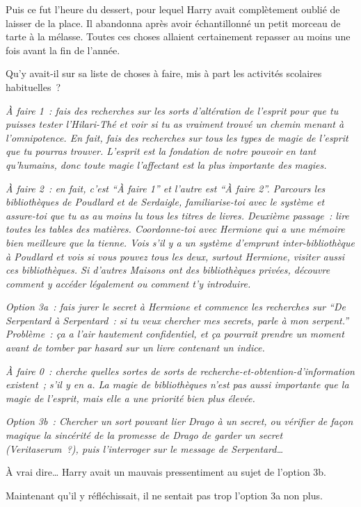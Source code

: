 Puis ce fut l'heure du dessert, pour lequel Harry avait complètement oublié de laisser de la place. Il abandonna après avoir échantillonné un petit morceau de tarte à la mélasse. Toutes ces choses allaient certainement repasser au moins une fois avant la fin de l'année.

Qu'y avait-il sur sa liste de choses à faire, mis à part les activités scolaires habituelles~?

\emph{À faire 1~: fais des recherches sur les sorts d'altération de l'esprit pour que tu puisses tester l'Hilari-Thé et voir si tu as vraiment trouvé un chemin menant à l'omnipotence. En fait, fais des recherches sur tous les types de magie de l'esprit que tu pourras trouver. L'esprit est la fondation de notre pouvoir en tant qu'humains, donc toute magie l'affectant est la plus importante des magies.}

\emph{À faire 2~: en fait, c'est “À faire 1” et l'autre est “À faire 2”. Parcours les bibliothèques de Poudlard et de Serdaigle, familiarise-toi avec le système et assure-toi que tu as au moins lu tous les titres de livres. Deuxième passage~: lire toutes les tables des matières. Coordonne-toi avec Hermione qui a une mémoire bien meilleure que la tienne. Vois s'il y a un système d'emprunt inter-bibliothèque à Poudlard et vois si vous pouvez tous les deux, surtout Hermione, visiter aussi ces bibliothèques. Si d'autres Maisons ont des bibliothèques privées, découvre comment y accéder légalement ou comment t'y introduire.}

\emph{Option 3a~: fais jurer le secret à Hermione et commence les recherches sur “De Serpentard à Serpentard~: si tu veux chercher mes secrets, parle à mon serpent.” Problème~: ça a l'air hautement confidentiel, et ça pourrait prendre un moment avant de tomber par hasard sur un livre contenant un indice.}

\emph{À faire 0~: cherche quelles sortes de sorts de recherche-et-obtention-d'information existent~; s'il y en a. La magie de bibliothèques n'est pas aussi importante que la magie de l'esprit, mais elle a une priorité bien plus élevée.}

\emph{Option 3b~: Chercher un sort pouvant lier Drago à un secret, ou vérifier de façon magique la sincérité de la promesse de Drago de garder un secret (Veritaserum~?), puis l'interroger sur le message de Serpentard…}

À vrai dire… Harry avait un mauvais pressentiment au sujet de l'option 3b.

Maintenant qu'il y réfléchissait, il ne sentait pas trop l'option 3a non plus.

